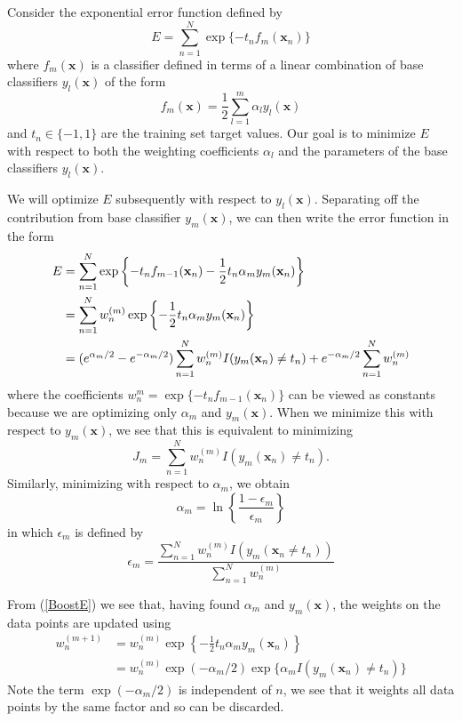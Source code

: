 \documentclass[a4paper]{report}
\renewcommand{\bf}{\mathbf}
\begin{document}
Consider the exponential error function defined by
\begin{equation}
	E = \sum_{n=1}^{N} \exp\{ -t_n f_m(\bf{x}_n) \}
\end{equation}
where $f_m(\bf{x})$ is a classifier defined in terms of a linear combination of base classifiers $y_l(\bf{x})$ of the form
\begin{equation}
	f_m(\bf{x}) = \frac{1}{2} \sum_{l=1}^{m} \alpha_l y_l(\bf{x})
\end{equation}
and $t_n \in \{-1,1 \}$ are the training set target values. Our goal is to minimize $E$ with respect to both the weighting coefficients $\alpha_l$ and the parameters of the base classifiers $y_l(\bf{x})$.

We will optimize $E$ subsequently with respect to $y_l(\bf{x})$. Separating off the contribution from base classifier $y_m(\bf{x})$, we can then write the error function in the form
\begin{align}
	E &= \sum_{n=1}^{N} \exp\left\{ -t_n f_{m-1}(\bf{x}_n) -\frac{1}{2} t_n \alpha_m y_m(\bf{x}_n) \right\} \notag\\
	&= \sum_{n=1}^{N} w_n^{(m)} \exp \left\{ -\frac{1}{2}t_n \alpha_m y_m(\bf{x}_n) \right\} \label{BoostE}	\\
	&= (e^{\alpha_m /2} - e^{-\alpha_m /2}) \sum_{n=1}^{N} w_n^{(m)} I(y_m(\bf{x}_n)\neq t_n)+e^{-\alpha_m /2}\sum_{n=1}^{N}w_n^{(m)}
\end{align}
where the coefficients $w_n^{m} = \exp \{ -t_n f_{m-1}(\bf{x}_n) \}$ can be viewed as constants because we are optimizing only $\alpha_m$ and $y_m(\bf{x})$. When we minimize this with respect to $y_m(\bf{x})$, we see that this is equivalent to minimizing
\begin{equation}
	J_m = \sum_{n=1}^{N} w_n^{(m)} I(y_m(\bf{x}_n)\neq t_n) \label{BoostJ}.
\end{equation}
Similarly, minimizing with respect to $\alpha_m$, we obtain
\begin{equation}
	\alpha_m = \ln \left\{ \frac{1-\epsilon_m}{\epsilon_m} \right\} \label{Boosta}
\end{equation}
in which $\epsilon_m$ is defined by 
\begin{equation}
	\epsilon_m = \frac{\sum_{n=1}^N w_n^{(m)}I(y_m(\bf{x}_n\neq t_n))}{\sum_{n=1}^N w_n^{(m)}} \label{Booste}
\end{equation}

From (\ref{BoostE}) we see that, having found $\alpha_m$ and $y_m(\bf{x})$, the weights on the data points are updated using
\begin{align}
	w_n^{(m+1)} &= w_n^{(m)} \exp \left\{ -\frac{1}{2} t_n \alpha_m y_m(\bf{x}_n) \right\}\\
	&= w_n^{(m)}\exp(-\alpha_m /2)\exp\{ \alpha_m I(y_m(\bf{x}_n)\neq t_n) \}
\end{align}
Note the term $\exp(-\alpha_m /2)$ is independent of $n$, we see that it weights all data points by the same factor and so can be discarded.
\end{document}
